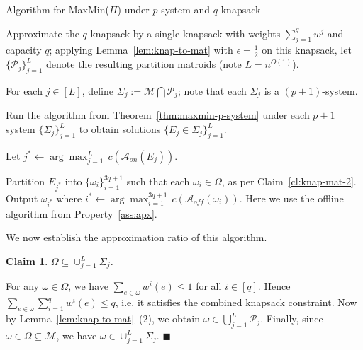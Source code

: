 \documentclass[11pt,letterpaper]{article}
\newtheorem{claim}[theorem]{Claim}
\newenvironment{proof}{

\noindent{\bf Proof:}} {\hfill$\blacksquare$


}
\def\p {\ensuremath{\mathcal{P}}\xspace}
\def\a{\ensuremath{\mathcal{A}}\xspace}
\def\ms{\ensuremath{\mathcal{M}}\xspace}
\def\cov{\ensuremath{\Pi}\xspace}
\def\mmp{{\sf MaxMin(\cov)}\xspace}
\newcommand{\sse}{\subseteq}
\newcounter{note}[section]
\begin{document}
\begin{algorithm}
\caption{Algorithm for \mmp under $p$-system and $q$-knapsack}
  \begin{algorithmic}[1]
  \STATE Approximate the $q$-knapsack by a single knapsack with weights $\sum_{j=1}^q w^j$ and capacity $q$; applying
  Lemma~\ref{lem:knap-to-mat} with $\epsilon=\frac12$ on this knapsack, let $\{\p_j\}_{j=1}^L$ denote the resulting partition matroids (note $L=n^{O(1)}$).

 \STATE For each $j\in [L]$, define $\Sigma_j := \ms\bigcap \p_j$; note that each $\Sigma_j$ is a $(p+1)$-system.

 \STATE Run the algorithm from Theorem~\ref{thm:maxmin-p-system} under each $p+1$ system $\{\Sigma_j\}_{j=1}^L$ to obtain
solutions $\{E_j\in \Sigma_j\}_{j=1}^L$.

 \STATE Let $j^*\gets \arg\max_{j=1}^L \, c\left(\a_{on}(E_j)\right)$.

 \STATE Partition $E_{j^*}$ into $\{\omega_i\}_{i=1}^{3q+1}$ such that each $\omega_i\in \Omega$, as per Claim~\ref{cl:knap-mat-2}.
 \STATE Output $\omega_{i^*}$ where $i^*\gets \arg\max_{i=1}^{3q+1} \, c\left(\a_{off}(\omega_i)\right)$. Here we use
 the offline algorithm from Property~\ref{ass:apx}.
\end{algorithmic}
\end{algorithm}

We now establish the approximation ratio of this algorithm.

\begin{claim}\label{cl:knap-mat-1}
$\Omega\sse \cup_{j=1}^L \Sigma_j$.
\end{claim}
\begin{proof}
For any $\omega\in \Omega$, we have $\sum_{e\in \omega} w^i(e) \le 1$ for all $i\in [q]$. Hence  $\sum_{e\in \omega}
\sum_{i=1}^q w^i(e) \le q$, i.e. it satisfies the combined knapsack constraint. Now by Lemma~\ref{lem:knap-to-mat}~(2),
we obtain $\omega\in \bigcup_{j=1}^L \p_j$. Finally, since $\omega\in \Omega\sse \ms$, we have  $\omega\in \cup_{j=1}^L
\Sigma_j$.
\end{proof}
\end{document}
